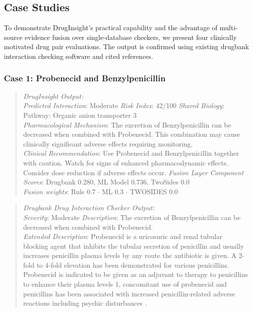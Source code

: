\documentclass[conference]{IEEEtran}
\begin{document}
\subsection{Case Studies}
To demonstrate DrugInsight's practical capability and the advantage of multi-source evidence fusion over single-database checkers, we present four clinically motivated drug pair evaluations. The output is confirmed using existing drugbank interaction checking software and cited references.


\subsubsection{\textbf{Case 1: Probenecid and Benzylpenicillin}}
\begin{quote}
\textit{DrugInsight Output:}\\
\textit{Predicted Interaction}: Moderate \newline\quad \textit{Risk Index}: 42/100\newline
\quad \textit{Shared Biology}: Pathway: Organic anion transporter 3\\ \newline
\textit{Pharmacological Mechanism}: The excretion of Benzylpenicillin can be decreased when combined with Probenecid. This combination may cause clinically significant adverse effects requiring monitoring. \\ \newline
\textit{Clinical Recommendation}: Use Probenecid and Benzylpenicillin together with caution. Watch for signs of enhanced pharmacodynamic effects. Consider dose reduction if adverse effects occur.
\textit{Fusion Layer Component Scores}: Drugbank 0.280, ML Model 0.736, TwoSides 0.0\\ \newline
\textit{Fusion weights}: Rule 0.7 $\cdot$ ML 0.3 $\cdot$ TWOSIDES 0.0
\end{quote}

\begin{quote}
\textit{Drugbank Drug Interaction Checker Output:}\\
\quad \textit{Severity}: Moderate \cite{drugbankchecker}\newline
\quad \textit{Description}: The excretion of Benzylpenicillin can be decreased when combined with Probenecid.\\ \newline
\textit{Extended Description}: Probenecid is a uricosuric and renal tubular blocking agent that inhibits the tubular secretion of penicillin and usually increases penicillin plasma levels by any route the antibiotic is given. A 2-fold to 4-fold elevation has been demonstrated for various penicillins. Probenecid is indicated to be given as an adjuvant to therapy to penicillins to enhance their plasma levels 1, concomitant use of probenecid and penicillins has been associated with increased penicillin-related adverse reactions including psychic disturbances \cite{dailymed_probenecid}. \\
\end{quote}
\end{document}
